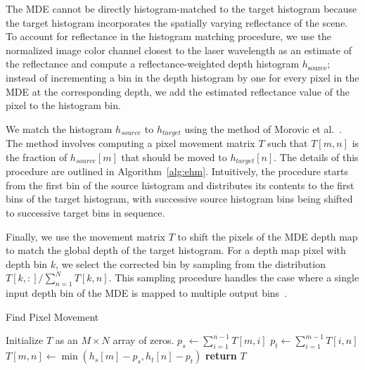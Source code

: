 The MDE cannot be directly histogram-matched to the target histogram
because the target histogram incorporates the spatially varying reflectance of
the scene. To account for reflectance in the histogram matching procedure,
we use the normalized image color channel closest to the laser wavelength as an
estimate of the reflectance and compute a reflectance-weighted depth histogram
$h_\text{source}$;
instead of incrementing a bin in the depth histogram by one for every pixel in the MDE
at the corresponding depth, we add the estimated reflectance value of the pixel
to the histogram bin.

We match the histogram $h_{source}$ to $h_{target}$ using the method of
Morovic et al.~\cite{Morovic2002}. The method involves computing a pixel movement
matrix $T$ such that $T[m, n]$ is the fraction of $h_{source}[m]$ that should be
moved to $h_{target}[n]$. The details of this procedure are outlined in
Algorithm~\ref{alg:ehm}. Intuitively, the procedure starts from the first bin of the
source histogram and distributes its contents to the first bins of the target
histogram, with successive source histogram bins being shifted to successive
target bins in sequence.

Finally, we use the movement matrix $T$ to shift the pixels of the MDE depth map
to match the global depth of the target histogram. For a depth map pixel with
depth bin $k$, we select the corrected bin by sampling from the distribution $T[k,
:]/\sum_{n=1}^NT[k,n]$. This sampling procedure handles the
case where a single input depth bin of the MDE is mapped to
multiple output bins~\cite{Morovic2002}.
%
\begin{algorithm}[H]
 \caption{Find Pixel Movement} 
 \label{alg:ehm}
 \begin{algorithmic}
    \State Initialize $T$ as an $M \times N$ array of zeros.
        \State $p_s \gets \sum_{i=1}^{n-1} T[m, i]$
        \State $p_t \gets \sum_{i=1}^{m-1} T[i, n]$
        \State $T[m, n] \gets \min(h_s[m] - p_s, h_t[n] - p_t)$
      \EndFor
    \EndFor
    \State \textbf{return} $T$
  \EndProcedure
 \end{algorithmic}
\end{algorithm}
%




